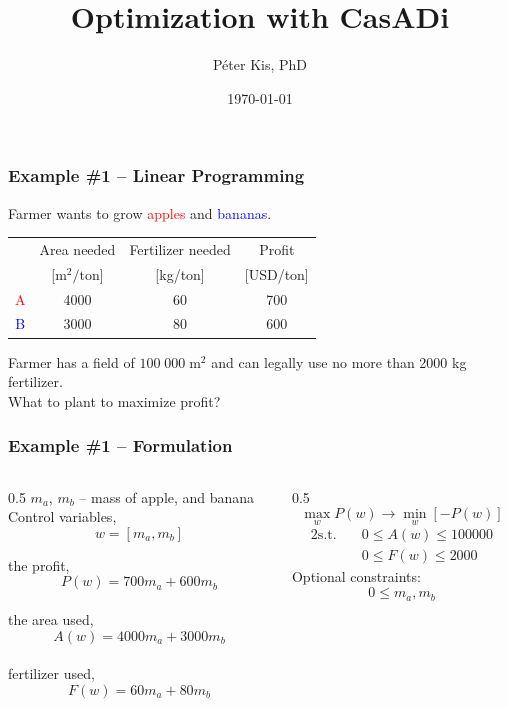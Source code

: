 \documentclass[aspectratio=169]{beamer}
\title{Optimization with CasADi}
\author{Péter Kis, PhD}
\date{\today}
\begin{document}
\begin{frame}
    \titlepage
\end{frame}


\begin{frame}
\frametitle{Example \#1 -- Linear Programming}
Farmer wants to grow \textcolor{red}{apples} and \textcolor{blue}{bananas}.
\begin{center}
\begin{tabular}{ c|c|c|c }
\hline
  & Area needed & Fertilizer needed & Profit\\
  & [$\text{m}^2/\text{ton}$] & [kg/ton] & [USD/ton] \\
  \hline
 \textcolor{red}{A} & 4000 & 60 & 700 \\
 \textcolor{blue}{B} & 3000 & 80 & 600 \\
 \hline
\end{tabular}
\end{center}
Farmer has a field of $100\;000\;\text{m}^2$ and can legally use no more than 2000 kg fertilizer.\\
\vspace{1em}
What to plant to maximize profit?
\end{frame}


\begin{frame}
 \frametitle{Example \#1 -- Formulation}
\begin{columns}
\begin{column}{0.5\textwidth}
$m_a$, $m_b$ -- mass of apple, and banana\\

Control variables, $$w = [m_a, m_b]$$

the profit, $$P(w) = 700 m_a + 600 m_b$$\\
the area used, $$A(w) = 4000 m_a + 3000 m_b$$\\
fertilizer used, $$F(w) = 60 m_a + 80 m_b$$\\
\end{column}
\begin{column}{0.5\textwidth}  %
$$\max_w P(w) \rightarrow \min_w [-P(w)] $$
\begin{alignat*}{2}
\text{s.t.}\quad & 0 \le A(w) \le 100000\\
& 0 \le F(w) \le 2000
\end{alignat*}
Optional constraints: \\
$$0 \le m_a, m_b $$
\end{column}
\end{columns}
\end{frame}
\end{document}
